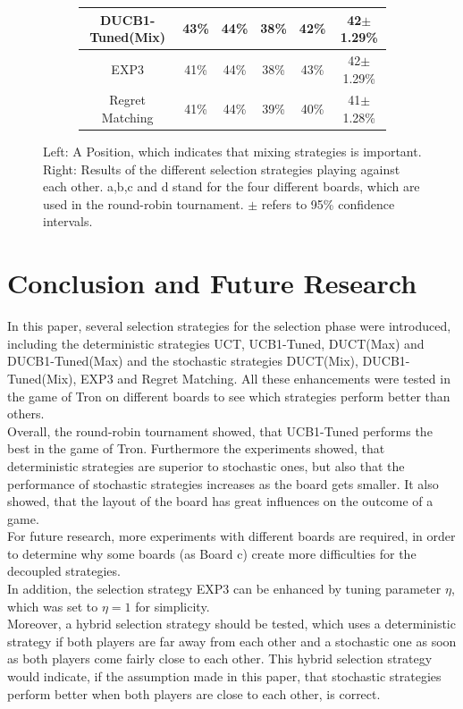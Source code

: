 \documentclass{article}
\begin{document}
\begin{figure}[t]
\begin{subfigure}[c]{0.5\textwidth}
\begin{tabular}{|c||c|c|c|c|c|}
	DUCB1-Tuned(Mix)	  & 43\%		& 44\%		& 38\%		& 42\%		& 42$\pm$1.29\%		\\ \hline
	EXP3			          & 41\%		& 44\%		& 38\%		& 43\%		& 42$\pm$1.29\%		\\ \hline
	Regret Matching		  & 41\%		& 44\%		& 39\%		& 40\%		& 41$\pm$1.28\%		\\ \hline
\end{tabular}
\end{subfigure}
\caption{Left: A Position, which indicates that mixing strategies is important. Right: Results of the different selection strategies playing against each other. a,b,c and d stand for the four different boards, which are used in the round-robin tournament. $\pm$ refers to 95\% confidence intervals.}
\label{fig:example_avgs}
\end{figure}



\section{Conclusion and Future Research}
\label{sec:conclusion}

In this paper, several selection strategies for the selection phase were introduced, including the deterministic strategies UCT, UCB1-Tuned, DUCT(Max) and DUCB1-Tuned(Max) and the stochastic strategies DUCT(Mix), DUCB1-Tuned(Mix), EXP3 and Regret Matching. All these enhancements were tested in the game of Tron on different boards to see which strategies perform better than others.\\
Overall, the round-robin tournament showed, that UCB1-Tuned performs the best in the game of Tron. Furthermore the experiments showed, that deterministic strategies are superior to stochastic ones, but also that the performance of stochastic strategies increases as the board gets smaller. It also showed, that the layout of the board has great influences on the outcome of a game.\\
For future research, more experiments with different boards are required, in order to determine why some boards (as Board c) create more difficulties for the decoupled strategies.\\
In addition, the selection strategy EXP3 can be enhanced by tuning parameter $\eta$, which was set to $\eta=1$ for simplicity.\\
Moreover, a hybrid selection strategy should be tested, which uses a deterministic strategy if both players are far away from each other and a stochastic one as soon as both players come fairly close to each other. This hybrid selection strategy would indicate, if the assumption made in this paper, that stochastic strategies perform better when both players are close to each other, is correct.





\end{document}
